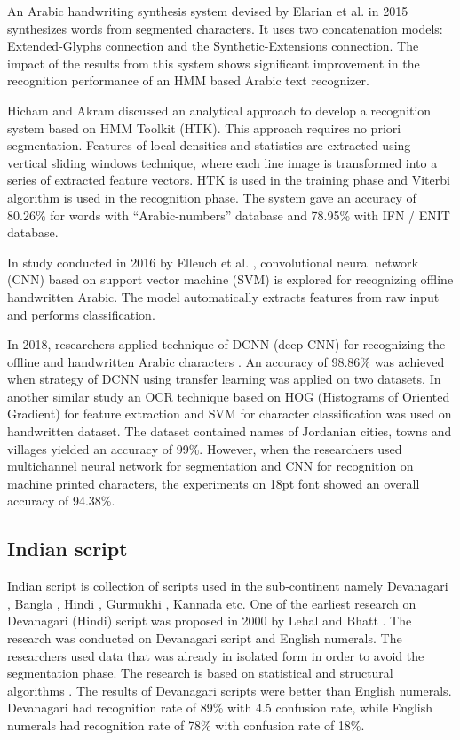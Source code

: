 \documentclass{article}
\begin{document}
 An Arabic handwriting synthesis system devised by Elarian et al. \cite{elarian2015arabic} in 2015 synthesizes words from segmented characters. It uses two concatenation models: Extended-Glyphs connection and the Synthetic-Extensions connection. The impact of the results from this system shows significant improvement in the recognition performance of an HMM based Arabic text recognizer. 

Hicham and Akram \cite{akram2016using} discussed an analytical approach to develop a recognition system based on HMM Toolkit (HTK). This approach requires no priori segmentation. Features of local densities and statistics are extracted using vertical sliding windows technique, where each line image is transformed into a series of extracted feature vectors. HTK is used in the training phase and Viterbi algorithm is used in the recognition phase. The system gave an accuracy of 80.26\% for words with “Arabic-numbers” database and 78.95\% with IFN / ENIT database.

In study conducted in 2016 by Elleuch et al. \cite{elleuch2016new}, convolutional neural network (CNN) based on support vector machine (SVM) is explored for recognizing offline handwritten Arabic. The model automatically extracts features from raw input and performs classification.  

In 2018, researchers applied technique of DCNN (deep CNN) for recognizing the offline and handwritten Arabic characters \cite{boufenar2018investigation}. An accuracy of 98.86\% was achieved when strategy of DCNN using transfer learning was applied on two datasets. In another similar study \cite{jebril2018recognition} an OCR technique based on HOG (Histograms of Oriented Gradient) \cite{ICME_Khan} for feature extraction and SVM for character classification was used on handwritten dataset. The dataset contained names of Jordanian cities, towns and villages yielded an accuracy of 99\%. However,  when the researchers used multichannel neural network for segmentation and CNN for recognition on machine printed characters, the experiments on 18pt font showed an overall accuracy of 94.38\%. 




\subsection{Indian script}
Indian script is collection of scripts used in the sub-continent namely Devanagari \cite{avadesh2018optical}, Bangla \cite{rabby2018bornonet}, Hindi \cite{dutta2017towards}, Gurmukhi \cite{singh2011feature}, Kannada \cite{sagar2008ocr} etc. One of the earliest research on Devanagari (Hindi) script was proposed in 2000 by Lehal and Bhatt \cite{lehal2000recognition}. The research was conducted on Devanagari script and English numerals. The researchers used data that was already in isolated form in order to avoid the segmentation phase. The research is based on statistical and structural algorithms \cite{kimura1991handwritten}. The results of Devanagari scripts were better than English numerals. Devanagari had recognition rate of 89\% with 4.5 confusion rate, while English numerals had recognition rate of 78\% with confusion rate of 18\%. 
\end{document}
